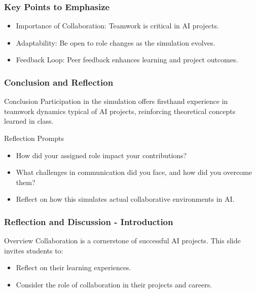 \documentclass[aspectratio=169]{beamer}
\begin{document}
\begin{frame}[fragile]
    \frametitle{Key Points to Emphasize}
    \begin{itemize}
        \item Importance of Collaboration: Teamwork is critical in AI projects.
        \item Adaptability: Be open to role changes as the simulation evolves.
        \item Feedback Loop: Peer feedback enhances learning and project outcomes.
    \end{itemize}
\end{frame}

\begin{frame}[fragile]
    \frametitle{Conclusion and Reflection}
    \begin{block}{Conclusion}
        Participation in the simulation offers firsthand experience in teamwork dynamics typical of AI projects, reinforcing theoretical concepts learned in class.
    \end{block}
    
    \begin{block}{Reflection Prompts}
        \begin{itemize}
            \item How did your assigned role impact your contributions?
            \item What challenges in communication did you face, and how did you overcome them?
            \item Reflect on how this simulates actual collaborative environments in AI.
        \end{itemize}
    \end{block}
\end{frame}

\begin{frame}[fragile]
    \frametitle{Reflection and Discussion - Introduction}
    \begin{block}{Overview}
        Collaboration is a cornerstone of successful AI projects. This slide invites students to:
        \begin{itemize}
            \item Reflect on their learning experiences.
            \item Consider the role of collaboration in their projects and careers.
        \end{itemize}
    \end{block}
\end{frame}
\end{document}
